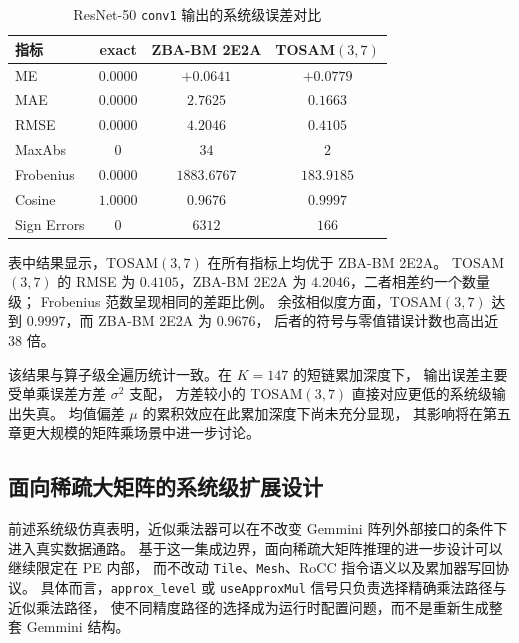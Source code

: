 \documentclass[12pt,a4paper,UTF8]{article}
\begin{document}
\begin{table}[htbp]
    \centering
    \caption{ResNet-50 \texttt{conv1} 输出的系统级误差对比}
    \label{tab:zbabm-tosam-resnet}
    \small
    \setlength{\tabcolsep}{5pt}
    \begin{tabular}{lccc}
        \toprule
        指标 & exact & ZBA-BM 2E2A & TOSAM$(3,7)$ \\
        \midrule
        ME           & $0.0000$  & $+0.0641$  & $+0.0779$ \\
        MAE          & $0.0000$  & $2.7625$   & $0.1663$ \\
        RMSE         & $0.0000$  & $4.2046$   & $0.4105$ \\
        MaxAbs       & $0$       & $34$       & $2$ \\
        Frobenius    & $0.0000$  & $1883.6767$ & $183.9185$ \\
        Cosine       & $1.0000$  & $0.9676$   & $0.9997$ \\
        Sign Errors  & $0$       & $6312$     & $166$ \\
        \bottomrule
    \end{tabular}
\end{table}

表中结果显示，TOSAM$(3,7)$ 在所有指标上均优于 ZBA-BM 2E2A。
TOSAM$(3,7)$ 的 RMSE 为 $0.4105$，ZBA-BM 2E2A 为 $4.2046$，二者相差约一个数量级；
Frobenius 范数呈现相同的差距比例。
余弦相似度方面，TOSAM$(3,7)$ 达到 $0.9997$，而 ZBA-BM 2E2A 为 $0.9676$，
后者的符号与零值错误计数也高出近 $38$ 倍。

该结果与算子级全遍历统计一致。在 $K{=}147$ 的短链累加深度下，
输出误差主要受单乘误差方差 $\sigma^2$ 支配，
方差较小的 TOSAM$(3,7)$ 直接对应更低的系统级输出失真。
均值偏差 $\mu$ 的累积效应在此累加深度下尚未充分显现，
其影响将在第五章更大规模的矩阵乘场景中进一步讨论。

\subsection{面向稀疏大矩阵的系统级扩展设计}
\label{subsec:system-extension}

前述系统级仿真表明，近似乘法器可以在不改变 Gemmini 阵列外部接口的条件下进入真实数据通路。
基于这一集成边界，面向稀疏大矩阵推理的进一步设计可以继续限定在 PE 内部，
而不改动 \texttt{Tile}、\texttt{Mesh}、RoCC 指令语义以及累加器写回协议。
具体而言，\texttt{approx\_level} 或 \texttt{useApproxMul} 信号只负责选择精确乘法路径与近似乘法路径，
使不同精度路径的选择成为运行时配置问题，而不是重新生成整套 Gemmini 结构。
\end{document}
